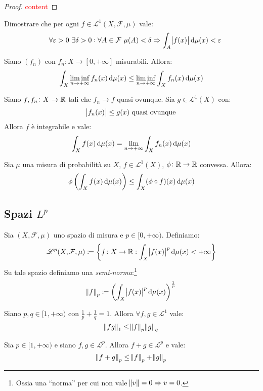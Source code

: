 \begin{proof}
    \textcolor{red}{content}
\end{proof}
\begin{exercise}
    Dimostrare che per ogni $ f \in \mathscr{L}^1(X,\mathcal{F},\mu) $ vale:
    \[ \quad \forall\epsilon > 0\ \exists \delta > 0 : \forall A\in\mathcal{F}\ \mu(A) < \delta \Rightarrow \int_A \abs{f(x)} \dif\mu(x) < \epsilon \]
\end{exercise}
\begin{exercise}
    Siano $ (f_n) $ con $ f_n\colon X\to[0,+\infty] $ misurabili. Allora:
    \[ \int_X \liminf_{n\to +\infty}f_n(x)\dif\mu(x) \leq \liminf_{n\to +\infty} \int_X f_n(x)\dif\mu(x) \]
\end{exercise}
\begin{exercise}
    Siano $ f, f_n\colon X\to\mathbb{R} $ tali che $ f_n\to f $ quasi ovunque. Sia $ g\in\mathscr{L}^1(X) $ con:
    \[ \abs{f_n(x)} \leq g(x) \text{ quasi ovunque} \]
    Allora $ f $ è integrabile e vale:
    \[ \int_X f(x)\dif\mu(x) = \lim_{n\to +\infty}\int_X f_n(x)\dif\mu(x) \]
\end{exercise}
\begin{exercise}
    Sia $ \mu $ una misura di probabilità su $ X $, $ f\in\mathscr{L}^1(X) $, $ \phi\colon \mathbb{R}\to\mathbb{R} $ convessa. Allora:
    \[ \phi\left(\int_X f(x)\dif\mu(x) \right) \leq \int_X (\phi\circ f)(x)\dif\mu(x) \]
\end{exercise}
\subsection{Spazi $ L^p $}
\begin{definition}
    Sia $ (X,\mathcal{F},\mu) $ uno spazio di misura e $ p\in[0,+\infty) $. Definiamo:
    \[ \mathscr{L}^p(X,\mathcal{F},\mu) \coloneqq \left\{ f\colon X\to \R : \int_X \abs{f(x)}^p \dif\mu(x) < +\infty \right\}  \]
    Su tale spazio definiamo una \emph{semi-norma}:\footnote{Ossia una ``norma'' per cui non vale $ \norm{v} = 0 \Rightarrow v=0 $.}
    \[ \norm{f}_p \coloneqq \left( \int_X \abs{f(x)}^p\dif\mu(x) \right)^{\frac{1}{p}} \]
\end{definition}
\begin{exercise}
    Siano $ p, q \in [1,+\infty) $ con $ \frac{1}{p} + \frac{1}{q} = 1 $. Allora $ \forall f,g \in \mathscr{L}^1 $ vale:
    \[ \norm{fg}_{1} \leq \norm{f}_p\norm{g}_q \]
\end{exercise}
\begin{exercise}
    Sia $ p\in[1,+\infty) $ e siano $ f,g \in\mathscr{L}^p$. Allora $ f+g \in\mathscr{L}^p $ e vale:
    \[ \norm{f+g}_p \leq \norm{f}_p + \norm{g}_p \]
\end{exercise}

